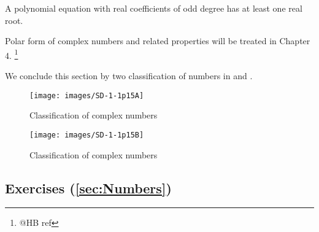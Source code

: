 \documentclass[11pt]{amsbook}
\begin{document}
\begin{cor}
	A polynomial equation with real coefficients of odd degree 
	has at least one real root.
\end{cor}
Polar form of complex numbers and related properties will be treated in Chapter 4.
\footnote{@HB ref}

We conclude this section by two classification of numbers in 
 and 
.

\begin{figure}[htb]
	\centering
	\texttt{[image: images/SD-1-1p15A]}
	\caption{Classification of complex numbers}
	\label{fig:classificationOfComplexNumbersA}
\end{figure}
\begin{figure}[htb]
	\centering
	\texttt{[image: images/SD-1-1p15B]}
	\caption{Classification of complex numbers}
	\label{fig:classificationOfComplexNumbersB}
\end{figure}




\subsection{Exercises (\ref{sec:Numbers})}
\label{subsec:Exercises}
\end{document}
